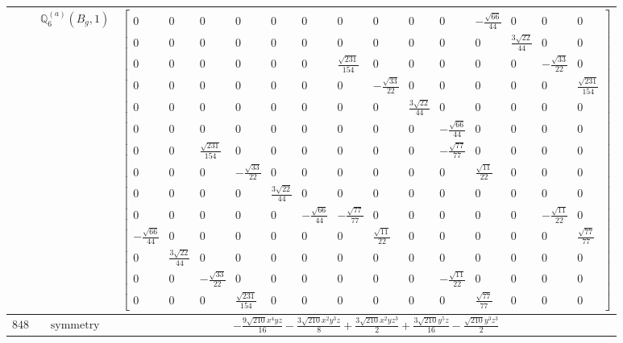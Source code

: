 \documentclass[fleqn,8pt,landscape]{jsarticle}
\begin{document}
\begin{longtable}{ccc}
$  $ & $ \mathbb{Q}_{6}^{(a)}(B_{g},1) $ & $ \begin{bmatrix} 0 & 0 & 0 & 0 & 0 & 0 & 0 & 0 & 0 & 0 & - \frac{\sqrt{66}}{44} & 0 & 0 & 0 \\ 0 & 0 & 0 & 0 & 0 & 0 & 0 & 0 & 0 & 0 & 0 & \frac{3 \sqrt{22}}{44} & 0 & 0 \\ 0 & 0 & 0 & 0 & 0 & 0 & \frac{\sqrt{231}}{154} & 0 & 0 & 0 & 0 & 0 & - \frac{\sqrt{33}}{22} & 0 \\ 0 & 0 & 0 & 0 & 0 & 0 & 0 & - \frac{\sqrt{33}}{22} & 0 & 0 & 0 & 0 & 0 & \frac{\sqrt{231}}{154} \\ 0 & 0 & 0 & 0 & 0 & 0 & 0 & 0 & \frac{3 \sqrt{22}}{44} & 0 & 0 & 0 & 0 & 0 \\ 0 & 0 & 0 & 0 & 0 & 0 & 0 & 0 & 0 & - \frac{\sqrt{66}}{44} & 0 & 0 & 0 & 0 \\ 0 & 0 & \frac{\sqrt{231}}{154} & 0 & 0 & 0 & 0 & 0 & 0 & - \frac{\sqrt{77}}{77} & 0 & 0 & 0 & 0 \\ 0 & 0 & 0 & - \frac{\sqrt{33}}{22} & 0 & 0 & 0 & 0 & 0 & 0 & \frac{\sqrt{11}}{22} & 0 & 0 & 0 \\ 0 & 0 & 0 & 0 & \frac{3 \sqrt{22}}{44} & 0 & 0 & 0 & 0 & 0 & 0 & 0 & 0 & 0 \\ 0 & 0 & 0 & 0 & 0 & - \frac{\sqrt{66}}{44} & - \frac{\sqrt{77}}{77} & 0 & 0 & 0 & 0 & 0 & - \frac{\sqrt{11}}{22} & 0 \\ - \frac{\sqrt{66}}{44} & 0 & 0 & 0 & 0 & 0 & 0 & \frac{\sqrt{11}}{22} & 0 & 0 & 0 & 0 & 0 & \frac{\sqrt{77}}{77} \\ 0 & \frac{3 \sqrt{22}}{44} & 0 & 0 & 0 & 0 & 0 & 0 & 0 & 0 & 0 & 0 & 0 & 0 \\ 0 & 0 & - \frac{\sqrt{33}}{22} & 0 & 0 & 0 & 0 & 0 & 0 & - \frac{\sqrt{11}}{22} & 0 & 0 & 0 & 0 \\ 0 & 0 & 0 & \frac{\sqrt{231}}{154} & 0 & 0 & 0 & 0 & 0 & 0 & \frac{\sqrt{77}}{77} & 0 & 0 & 0 \end{bmatrix} $ \\ \hline
$ 848 $ & $ \text{symmetry} $ & $ - \frac{9 \sqrt{210} x^{4} y z}{16} - \frac{3 \sqrt{210} x^{2} y^{3} z}{8} + \frac{3 \sqrt{210} x^{2} y z^{3}}{2} + \frac{3 \sqrt{210} y^{5} z}{16} - \frac{\sqrt{210} y^{3} z^{3}}{2} $ \\

\end{longtable}
\end{document}
